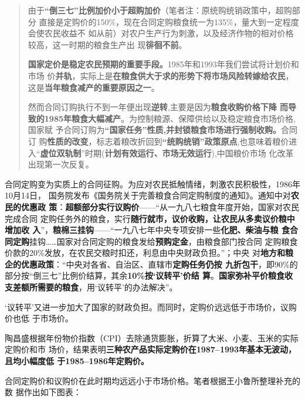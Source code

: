 \begin{quotation}
  由于\textbf{“倒三七”比例加价小于超购加价}（笔者注：原统购统销政策中，超购部分
  直接是定购价的150\%，现在合同定购粮食统一为135\%，量大到一定程度会使农民收益不
  如从前）对农户生产行为刺激，以及经济作物的相对价格较高，这一时期的粮食生产出
  现\textbf{徘徊不前}。\cite{shuangguizhi}

  \textbf{国家定价是稳定农民预期的重要手段。}1985年和1993年我们尝试将计划价和市场
  价\textbf{并轨}，实际上是\textbf{在粮食供大于求的形势下将市场风险转嫁给农民}，
  这是\textbf{当年粮食减产的重要原因之一}。\cite{lumaisg}

  然而合同订购执行不到一年便出现\textbf{逆转},主要是因为\textbf{粮食收购价格下降
    而导致的1985年粮食大幅减产}。为控制粮源、保障供给以及稳定粮食市场价格,国家赋
  予合同订购为\textbf{“国家任务”性质,并封锁粮食市场进行强制收购。}合同订
  购\textbf{性质的改变}，标志着粮改折回到\textbf{“统购统销”政策原点},也意味着粮价进
  入“\textbf{虚位双轨制}”时期(\textbf{计划有效运行、市场无效运行}),中国粮价市场
  化改革出现第一次反复。\cite{liangshi40}
\end{quotation}

合同定购变为实质上的合同征购。为应对农民抵触情绪，刺激农民积极性，1986年10月14日，
国务院发布《国务院关于完善粮食合同定购制度的通知》。通知中对\textbf{农民的优惠政
  策}：\textbf{超额部分实行议购价}——“从一九八七粮食年度开始，国家对农民完成合同
定购任务外的粮食，实行\textbf{随行就市，议价收购，让农民从多卖议价粮中增加收
  入}”，\textbf{粮棉三挂钩}——“一九八七年中央专项安排一些\textbf{化肥、柴油与粮
  食合同定购}挂钩……国家对合同定购的粮食发给\textbf{预购定金}，由粮食部门按合同
定购粮食价款的20\%发放，在农民交粮时扣还，利息由中央财政负担。”；中央
对\textbf{地方和粮企的优惠政策}：“中央对各省、自治区、直辖市\textbf{定购任务仍按
  九折包干}，即90\%的部分按“倒三七”比例价结算，其余\textbf{10\%按‘议转平’价结
  算}。\textbf{国家弥补平价粮食收支差额所需要的粮食}，用‘议转平’的办法解决”。

‘议转平’又进一步加大了国家的财政负担。而同时，定购价远远低于市场价，议购价也低
于市场价。

陶昌盛根据年份物价指数（CPI）去除通货膨胀，折算了大米、小麦、玉米的实际定购价和市
场价，结果表明\textbf{三种农产品实际定购价在1987--1993年基本无波动，且均小幅度低
  于1985--1986年定购价。}\cite{taochangsheng}

合同定购价和议购价在此时期均远远小于市场价格。笔者根据王小鲁所整理补充的数
据\cite{wangxiaoluliangshi}作出如下图表：




